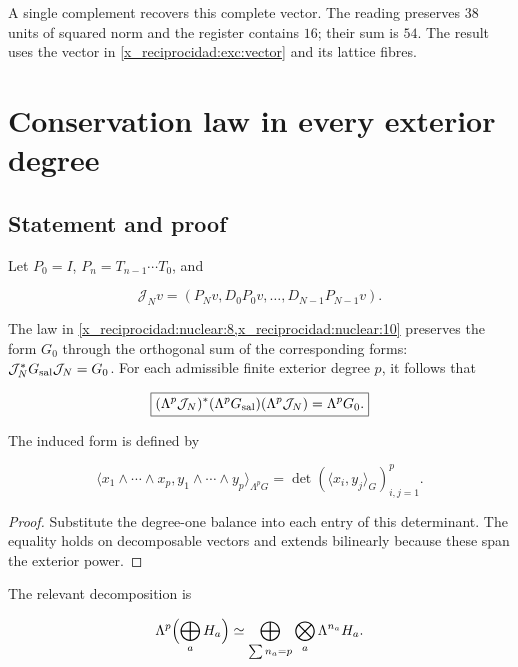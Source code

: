 A single complement recovers this complete vector. The reading preserves \(38\) units of squared norm and the register contains \(16\); their sum is \(54\). The result uses the vector in \eqref{x_reciprocidad:exc:vector} and its lattice fibres.

\section{Conservation law in every exterior degree}

\subsection{Statement and proof}

Let \(P_0=I\), \(P_n=T_{n-1}\cdots T_0\), and



\[
\mathcal J_Nv=(P_Nv,D_0P_0v,\ldots,D_{N-1}P_{N-1}v).
\]



The law in \cref{x_reciprocidad:nuclear:8,x_reciprocidad:nuclear:10} preserves the form \(G_0\) through the orthogonal sum of the corresponding forms: \(\mathcal J_N^*G_{\rm sal}\mathcal J_N=G_0\). For each admissible finite exterior degree \(p\), it follows that



\begin{equation}
\boxed{
(\Lambda^p\mathcal J_N)^*(\Lambda^pG_{\rm sal})
(\Lambda^p\mathcal J_N)=\Lambda^pG_0.
}
\label{x_reciprocidad:nuc11:eq:20}
\end{equation}



The induced form is defined by



\[
\langle x_1\wedge\cdots\wedge x_p,
y_1\wedge\cdots\wedge y_p\rangle_{\Lambda^pG}
=\det(\langle x_i,y_j\rangle_G)_{i,j=1}^p.
\]



\begin{proof}
Substitute the degree-one balance into each entry of this determinant. The equality holds on decomposable vectors and extends bilinearly because these span the exterior power.
\end{proof}

The relevant decomposition is



\[
\Lambda^p\Bigl(\bigoplus_aH_a\Bigr)
\simeq\bigoplus_{\sum n_a=p}\bigotimes_a\Lambda^{n_a}H_a.
\]



